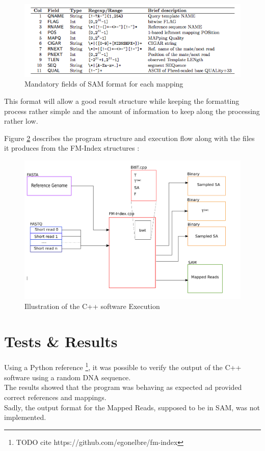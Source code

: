\begin{figure}[H]
    \centering
    \includegraphics[scale = 0.78]{Figures/SAMv1_3.png}
    \caption{Mandatory fields of SAM format for each mapping}
    \label{fig:samf}
\end{figure}
\vspace*{4mm}

This format will allow a good result structure while keeping the formatting process rather simple and the amount of information to keep along the processing rather low. 

Figure \ref{fig:cpp_workflow} describes the program structure and execution flow along with the files it produces from the FM-Index structures :

\begin{figure}[H]
    \centering
    \includegraphics[scale = 0.4]{Figures/cpp_workflow.png}
    \caption{Illustration of the C++ software Execution}
    \label{fig:cpp_workflow}
\end{figure}



\section{Tests \& Results}

Using a Python reference \footnote{TODO cite https://github.com/egonelbre/fm-index}, it was possible to verify the output of the C++ software using a random DNA sequence. \\

The results showed that the program was behaving as expected ad provided correct references and mappings. \\

Sadly, the output format for the Mapped Reads, supposed to be in SAM, was not implemented.
